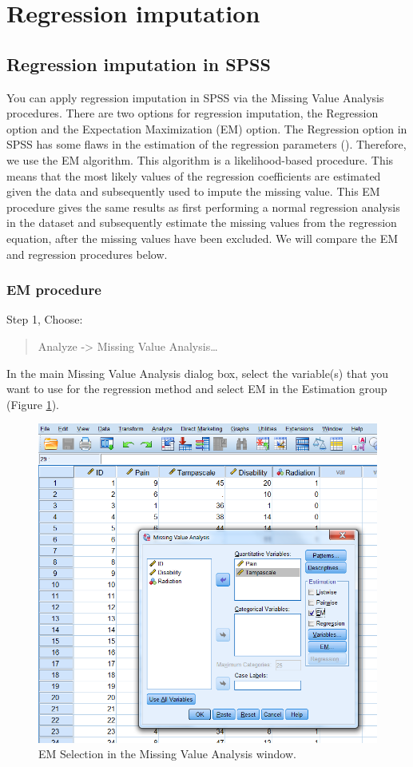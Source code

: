 \documentclass[]{book}
\theoremstyle{definition}
\theoremstyle{definition}
\theoremstyle{definition}
\theoremstyle{remark}
\begin{document}
\section{Regression imputation}\label{regression-imputation}

\subsection{Regression imputation in
SPSS}\label{regression-imputation-in-spss}

You can apply regression imputation in SPSS via the Missing Value
Analysis procedures. There are two options for regression imputation,
the Regression option and the Expectation Maximization (EM) option. The
Regression option in SPSS has some flaws in the estimation of the
regression parameters (\citet{hippel1}). Therefore, we use the EM
algorithm. This algorithm is a likelihood-based procedure. This means
that the most likely values of the regression coefficients are estimated
given the data and subsequently used to impute the missing value. This
EM procedure gives the same results as first performing a normal
regression analysis in the dataset and subsequently estimate the missing
values from the regression equation, after the missing values have been
excluded. We will compare the EM and regression procedures below.

\subsubsection{EM procedure}\label{em-procedure}

Step 1, Choose:

\begin{quote}
Analyze -\textgreater{} Missing Value Analysis\ldots{}
\end{quote}

In the main Missing Value Analysis dialog box, select the variable(s)
that you want to use for the regression method and select EM in the
Estimation group (Figure \ref{fig:fig3-10}).

\begin{figure}

{\centering \includegraphics[width=0.7\linewidth]{images/fig3.10} 

}

\caption{EM Selection in the Missing Value Analysis window.}\label{fig:fig3-10}
\end{figure}
\end{document}
